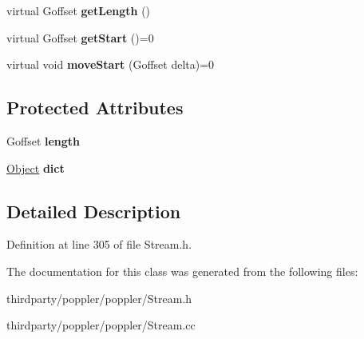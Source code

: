 \begin{DoxyCompactItemize}
\item 
\mbox{\label{class_base_stream_a023ee51fad60dc59e54bd38014be756a}} 
virtual Goffset {\bfseries get\+Length} ()
\item 
\mbox{\label{class_base_stream_a6a7c150f42971ff329656fc98e68b69e}} 
virtual Goffset {\bfseries get\+Start} ()=0
\item 
\mbox{\label{class_base_stream_a72298a03e84007d4381fd14dc7726262}} 
virtual void {\bfseries move\+Start} (Goffset delta)=0
\end{DoxyCompactItemize}
\subsection*{Protected Attributes}
\begin{DoxyCompactItemize}
\item 
\mbox{\label{class_base_stream_a27990e96583f15766a493c2c1bf0edee}} 
Goffset {\bfseries length}
\item 
\mbox{\label{class_base_stream_a5581b68734d93b915ffc6e763f003fff}} 
\hyperlink{class_object}{Object} {\bfseries dict}
\end{DoxyCompactItemize}


\subsection{Detailed Description}


Definition at line 305 of file Stream.\+h.



The documentation for this class was generated from the following files\+:\begin{DoxyCompactItemize}
\item 
thirdparty/poppler/poppler/Stream.\+h\item 
thirdparty/poppler/poppler/Stream.\+cc\end{DoxyCompactItemize}
